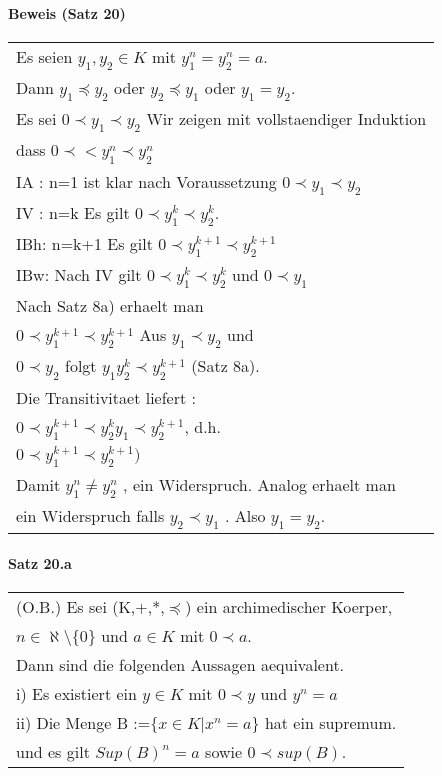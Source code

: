 \documentclass[a4paper]{scrartcl}
\begin{document}
\paragraph{Beweis (Satz 20)}
\begin{tabbing}
\begin{tabular}{l}
Es seien $y_1,y_2 \in K$ mit $y^n_1 = y^n_2 = a$.\\
Dann $y_1 \preceq y_2$ oder $y_2 \preceq y_1$ oder $ y_1 = y_2$.\\
Es sei $0\prec y_1 \prec y_2$ Wir zeigen mit vollstaendiger Induktion\\
dass $0 \prec <y^n_1 \prec y^n_2$\\
IA : n=1 ist klar nach Voraussetzung $ 0 \prec y_1 \prec y_2 $\\
IV : n=k Es gilt $ 0 \prec y^k_1 \prec y^k_2$.\\
IBh: n=k+1 Es gilt $0 \prec y^{k+1}_1 \prec y^{k+1}_2$\\
IBw: Nach IV gilt $0 \prec y^k_1 \prec y^k_2$ und $0\prec y_1$ \\
Nach Satz 8a) erhaelt man\\
$0 \prec y^{k+1}_1 \prec y^{k+1}_2$ Aus $y_1 \prec y_2$ und\\
$0 \prec y_2$ folgt $ y_1y_2^k \prec y_2^{k+1} $ (Satz 8a). \\
Die Transitivitaet liefert :\\
$0 \prec y_1^{k+1} \prec y_2^ky_1\prec y_2^{k+1}$, d.h.\\
$0\prec y_1^{k+1} \prec y_2^{k+1})$\\
Damit $y_1^n \neq y_2^n$ , ein Widerspruch. Analog erhaelt man\\
ein Widerspruch falls $y_2 \prec y_1$ . Also $y_1 = y_2$.
\end{tabular}
\end{tabbing}

\paragraph{Satz 20.a}
\begin{tabbing}
\begin{tabular}{l}
(O.B.) Es sei (K,+,*,$\preceq$) ein archimedischer Koerper,\\
$n\in \aleph \setminus \{ 0\}$ und $a\in K$ mit $0\prec a$.\\
Dann sind die folgenden Aussagen aequivalent.\\
i) Es existiert ein $y\in K$ mit $0\prec y$ und $y^n=a$\\
ii) Die Menge B :=$\{ x\in K| x^n=a\}$ hat ein supremum.\\
und es gilt $Sup(B)^n=a$ sowie $0\prec sup(B)$.\\
\end{tabular}
\end{tabbing}
\end{document}
